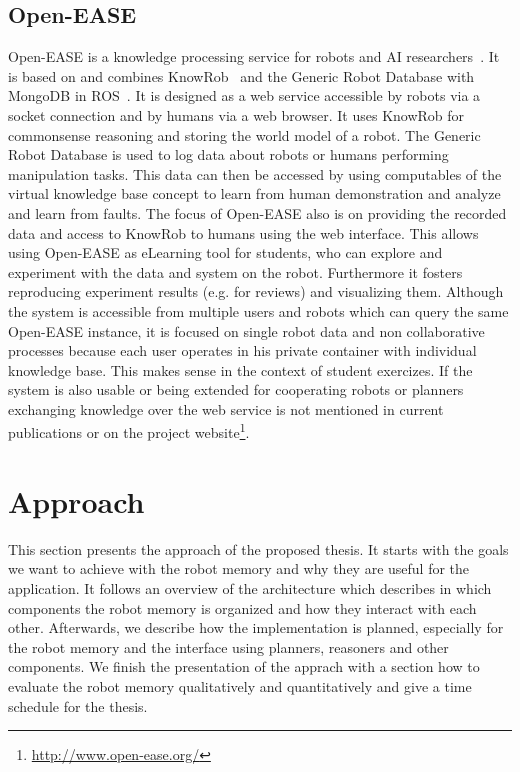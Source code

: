 \documentclass[a4paper,11pt]{article}
\begin{document}
\subsection{Open-EASE}
\label{sec:openease}
Open-EASE is a knowledge processing service for robots and AI
researchers~\cite{OpenEASE}. It is based on and combines
KnowRob~\cite{KnowRob} and the Generic Robot Database with MongoDB in
ROS~\cite{RoboDB}. It is designed as a web service accessible by
robots via a socket connection and by humans via a web browser. It
uses KnowRob for commonsense reasoning and storing the world model of
a robot. The Generic Robot Database is used to log data about robots
or humans performing manipulation tasks. This data can then be
accessed by using computables of the virtual knowledge base concept to
learn from human demonstration and analyze and learn from faults. The
focus of Open-EASE also is on providing the recorded data and access
to KnowRob to humans using the web interface. This allows using
Open-EASE as eLearning tool for students, who can explore and
experiment with the data and system on the robot. Furthermore it
fosters reproducing experiment results (e.g. for reviews) and
visualizing them. Although the system is accessible from multiple
users and robots which can query the same Open-EASE instance, it is
focused on single robot data and non collaborative processes because
each user operates in his private container with individual knowledge
base. This makes sense in the context of student exercizes. If the
system is also usable or being extended for cooperating robots or
planners exchanging knowledge over the web service is not mentioned in
current publications or on the project
website\footnote{\url{http://www.open-ease.org/}}.


\section{Approach}
\label{sec:approach}
This section presents the approach of the proposed thesis. It starts
with the goals we want to achieve with the robot memory and why they
are useful for the application. It follows an overview of the
architecture which describes in which components the robot memory is
organized and how they interact with each other. Afterwards, we
describe how the implementation is planned, especially for the robot
memory and the interface using planners, reasoners and other
components. We finish the presentation of the apprach with a section
how to evaluate the robot memory qualitatively and quantitatively and
give a time schedule for the thesis.
\end{document}
